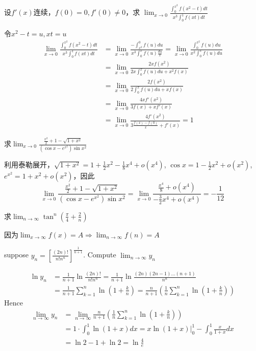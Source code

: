 \documentclass{article}
\begin{document}
\begin{examplle}[]
设\(f'(x)\)连续，\(f(0)=0,f'(0)\neq0\)，求
\(\displaystyle\lim_{x\to0}\frac{\int_0^{x^2}f(x^2-t)dt}{x^3\int_0^1f(xt)dt}\)

令\(x^2-t=u,xt=u\)
\begin{align*}
\lim_{x\to0}\frac{\int_0^{x^2}f(x^2-t)dt}{x^3\int_0^1f(xt)dt}&=
\lim_{x\to0}\frac{-\int_{x^2}^0f(u)du}{x^3\int_0^xf(u)\frac{du}{x}}=
\lim_{x\to0}\frac{\int_0^{x^2}f(u)du}{x^2\int_0^xf(u)du}\\
&=\lim_{x\to0}\frac{2xf(x^2)}{2x\int_0^xf(u)du+x^2f(x)}\\
&=\lim_{x\to0}\frac{2f(x^2)}{2\int_0^xf(u)du+xf(x)}\\
&=\lim_{x\to0}\frac{4xf'(x^2)}{3f(x)+xf'(x)}\\
&=\lim_{x\to0}\frac{4f'(x^2)}{3\frac{f(x)-f(0)}{x}+f'(x)}=1
\end{align*}
\end{examplle}

\begin{examplle}[]
求\(\displaystyle\lim_{x\to0}\frac{\frac{x^2}{2}+1-\sqrt{1+x^2}}{(\cos x-e^{x^2})\sin
  x^2}\)

利用泰勒展开，\(\sqrt{1+x^2}=1+\frac{1}{2}x^2-\frac{1}{8}x^4+o(x^4)\),
\(\cos x=1-\frac{1}{2}x^2+o(x^2)\),\(e^{x^2}=1+x^2+o(x^2)\)，因此
\begin{equation*}
\lim_{x\to0}\frac{\frac{x^2}{2}+1-\sqrt{1+x^2}}{(\cos x-e^{x^2})\sin
x^2}=\lim_{x\to0}\frac{\frac{x^4}{8}+o(x^4)}{-\frac{3}{2}x^4+o(x^4)}=-\frac{1}{12}
\end{equation*}
\end{examplle}

\begin{examplle}[]
求\(\displaystyle\lim_{n\to\infty}\tan^n(\frac{\pi}{4}+\frac{2}{n})\)

因为\(\lim_{x\to\infty}f(x)=A\Rightarrow\lim_{n\to\infty}f(n)=A\)
\end{examplle}

\begin{examplle}[]
suppose \(\displaystyle y_n=\left[\frac{(2n)!}{n!n^n}\right]^{\frac{1}{n+1}}\). Compute
\(\lim_{n\to\infty}y_n\)

\begin{align*}
\ln y_n&=\frac{1}{n+1}\ln\frac{(2n)!}{n!n^n}=
\frac{1}{n+1}\ln\frac{(2n)(2n-1)\dots(n+1)}{n^n}\\
&=\frac{1}{n+1}\sum_{k=1}^n\ln(1+\frac{k}{n})=
\frac{n}{n+1}\left(
\frac{1}{n}\sum_{k=1}^n\ln(1+\frac{k}{n})
\right)
\end{align*}
Hence
\begin{align*}
\lim_{n\to\infty}y_n&=\lim_{n\to\infty}\frac{n}{n+1}\left(
\frac{1}{n}\sum_{k=1}^n\ln(1+\frac{k}{n})
\right)\\
&=1\cdot\int_0^1\ln(1+x)dx=
x\ln(1+x)\rvert_0^1-\int_0^1\frac{x}{1+x}dx\\
&=\ln2-1+\ln2=\ln\frac{4}{e}
\end{align*}
\end{examplle}
\end{document}
